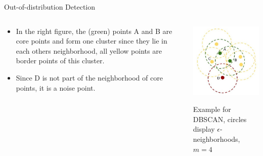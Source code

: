 \documentclass[11pt,compress,t,notes=noshow, xcolor=table]{beamer}
\begin{document}
\begin{frame}{Out-of-distribution Detection}
\vspace{-0.6cm}
\begin{columns}
	\begin{column}{0.68\textwidth}
		\begin{itemize}
			\item In the right figure, the (green) points A and B are core points and form one cluster since they lie in each others neighborhood, all yellow points are border points of this cluster. 
			\item Since D is not part of the neighborhood of core points, it is a noise point. 
		\end{itemize}
	\end{column}
	\begin{column}{0.27\textwidth}
		\vspace{-0.4cm}
		\begin{center}
			\includegraphics[width=1\textwidth]{figure/dbscan.jpg}
			
			\tiny{Example for DBSCAN, circles display $\epsilon$-neighborhoods, $m = 4$}
			

\end{center}
\end{column}
\end{columns}
\end{frame}
\end{document}
